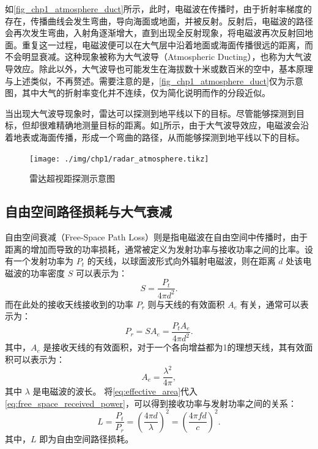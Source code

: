 如\cref{fig_chp1_atmosphere_duct}所示，此时，电磁波在传播时，由于折射率梯度的存在，传播曲线会发生弯曲，导向海面或地面，并被反射。反射后，电磁波的路径会再次发生弯曲，入射角逐渐增大，直到出现全反射现象，将电磁波再次反射回地面。重复这一过程，电磁波便可以在大气层中沿着地面或海面传播很远的距离，而不会明显衰减。这种现象被称为大气波导（Atmospheric Ducting），也称为大气波导效应。除此以外，大气波导也可能发生在海拔数十米或数百米的空中，基本原理与上述类似，不再赘述。需要注意的是，\cref{fig_chp1_atmosphere_duct}仅为示意图，其中大气的折射率变化并不连续，仅为简化说明而作的分段近似。

当出现大气波导现象时，雷达可以探测到地平线以下的目标。尽管能够探测到目标，但却很难精确地测量目标的距离。如\cref{fig_chp1_radar_ducting}所示，由于大气波导效应，电磁波会沿着地表或海面传播，形成一个弯曲的路径，从而能够探测到地平线以下的目标。
\begin{figure}[htb!]
    \centering
    \texttt{[image: ./img/chp1/radar\_atmosphere.tikz]}
    \caption{雷达超视距探测示意图}
    \label{fig_chp1_radar_ducting}
\end{figure}

\subsection{自由空间路径损耗与大气衰减}

自由空间衰减（Free-Space Path Loss）则是指电磁波在自由空间中传播时，由于距离的增加而导致的功率损耗，通常被定义为发射功率与接收功率之间的比率。设有一个发射功率为 $P_t$ 的天线，以球面波形式向外辐射电磁波，则在距离 $d$ 处该电磁波的功率密度 $S$ 可以表示为：
\begin{equation}
    S = \frac{P_t}{4 \pi d^2}.
    \label{eq:free_space_power_density}
\end{equation}
而在此处的接收天线接收到的功率 $P_r$ 则与天线的有效面积 $A_e$ 有关，通常可以表示为：
\begin{equation}
    P_r = S A_e = \frac{P_t A_e}{4 \pi d^2}.
    \label{eq:free_space_received_power}
\end{equation}
其中，$A_e$ 是接收天线的有效面积，对于一个各向增益都为1的理想天线，其有效面积可以表示为：
\begin{equation}
    A_e = \frac{\lambda^2}{4 \pi},
    \label{eq:effective_area}
\end{equation}
其中 $\lambda$ 是电磁波的波长。
将\cref{eq:effective_area}代入\cref{eq:free_space_received_power}，可以得到接收功率与发射功率之间的关系：
\begin{equation}
    L = \frac{P_t}{P_r} = \left( \frac{4 \pi d}{\lambda} \right)^2 = \left( \frac{4 \pi f d}{c} \right)^2.
    \label{eq:free_space_received_power_final}
\end{equation}
其中，$L$ 即为自由空间路径损耗。


